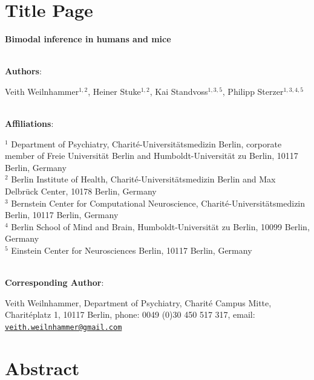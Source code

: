 \documentclass[
]{article}
\author{}
\date{\vspace{-2.5em}}
\begin{document}
\hypertarget{title-page}{%
\section{Title Page}\label{title-page}}

\textbf{Bimodal inference in humans and mice}\\
\strut \\

\textbf{Authors}:

Veith Weilnhammer\(^{1,2}\), Heiner Stuke\(^{1,2}\), Kai
Standvoss\(^{1,3,5}\), Philipp Sterzer\(^{1,3,4,5}\)\\
\strut \\
\textbf{Affiliations}:

\(^{1}\) Department of Psychiatry, Charité-Universitätsmedizin Berlin,
corporate member of Freie Universität Berlin and Humboldt-Universität zu
Berlin, 10117 Berlin, Germany\\
\(^{2}\) Berlin Institute of Health, Charité-Universitätsmedizin Berlin
and Max Delbrück Center, 10178 Berlin, Germany\\
\(^{3}\) Bernstein Center for Computational Neuroscience,
Charité-Universitätsmedizin Berlin, 10117 Berlin, Germany\\
\(^{4}\) Berlin School of Mind and Brain, Humboldt-Universität zu
Berlin, 10099 Berlin, Germany\\
\(^{5}\) Einstein Center for Neurosciences Berlin, 10117 Berlin,
Germany\\
\strut \\

\textbf{Corresponding Author}:

Veith Weilnhammer, Department of Psychiatry, Charité Campus Mitte,
Charitéplatz 1, 10117 Berlin, phone: 0049 (0)30 450 517 317, email:
\href{mailto:veith.weilnhammer@gmail.com}{\nolinkurl{veith.weilnhammer@gmail.com}}\\

\newpage

\linenumbers

\hypertarget{abstract}{%
\section{Abstract}\label{abstract}}
\end{document}
